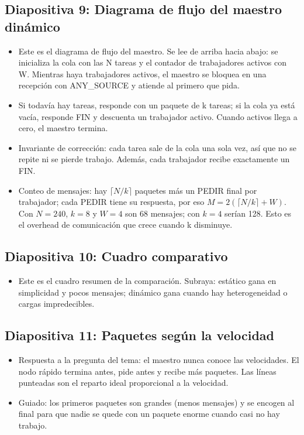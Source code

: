 \documentclass[11pt,a4paper]{article}
\begin{document}
\subsection*{Diapositiva 9: Diagrama de flujo del maestro dinámico}
\begin{itemize}
  \item Este es el diagrama de flujo del maestro. Se lee de arriba hacia abajo: se inicializa la cola con las N tareas y el contador de trabajadores activos con W. Mientras haya trabajadores activos, el maestro se bloquea en una recepción con ANY\_SOURCE y atiende al primero que pida.
  \item Si todavía hay tareas, responde con un paquete de k tareas; si la cola ya está vacía, responde FIN y descuenta un trabajador activo. Cuando activos llega a cero, el maestro termina.
  \item Invariante de corrección: cada tarea sale de la cola una sola vez, así que no se repite ni se pierde trabajo. Además, cada trabajador recibe exactamente un FIN.
  \item Conteo de mensajes: hay $\lceil N/k\rceil$ paquetes más un PEDIR final por trabajador; cada PEDIR tiene su respuesta, por eso $M=2(\lceil N/k\rceil+W)$. Con $N=240$, $k=8$ y $W=4$ son 68 mensajes; con $k=4$ serían 128. Esto es el overhead de comunicación que crece cuando k disminuye.
\end{itemize}

\subsection*{Diapositiva 10: Cuadro comparativo}
\begin{itemize}
  \item Este es el cuadro resumen de la comparación. Subraya: estático gana en simplicidad y pocos mensajes; dinámico gana cuando hay heterogeneidad o cargas impredecibles.
\end{itemize}

\subsection*{Diapositiva 11: Paquetes según la velocidad}
\begin{itemize}
  \item Respuesta a la pregunta del tema: el maestro nunca conoce las velocidades. El nodo rápido termina antes, pide antes y recibe más paquetes. Las líneas punteadas son el reparto ideal proporcional a la velocidad.
  \item Guiado: los primeros paquetes son grandes (menos mensajes) y se encogen al final para que nadie se quede con un paquete enorme cuando casi no hay trabajo.
\end{itemize}
\end{document}
